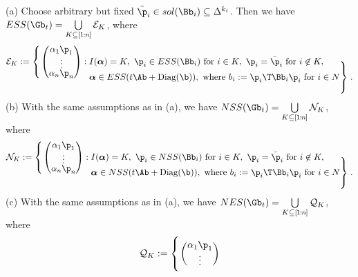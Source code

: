 \documentclass[moor]{informs3}              %
\def\Biggg#1{{\hbox{$\left#1\vbox to 20pt{}\right.$}}}
\def\Bigggl{\mathopen\Biggg}
\def\Bigggr{\mathclose\Biggg}
\def\irg#1#2{{ \in\! [{#1}\! : \! {#2}]}}
\def\rg#1#2{{ [\kern-.5pt{#1}\kern-.5pt : \kern-.5pt {#2}\kern-.5pt]}}
\def\coma#1{{#1}}
\begin{document}
\begin{thm}\label{bloa}
(a) Choose arbitrary but fixed $\bar\p_i\in {sol}(\Bb_i) \subseteq \Delta^{k_i}$.
Then we have $ESS(\Gb_t)=\bigcup\limits_{K\subseteq {\rg 1n}}\mathcal{E}_K$, where
\begin{equation}\begin{aligned}\label{ek}
\renewcommand*{\arraystretch}{.5}
\mathcal{E}_K:=\Bigggl\{\begin{pmatrix}
\alpha_1\p_1 \\
\vdots \\
\alpha_n\p_n
\end{pmatrix}:{} &{} I(\bm{\alpha})=K,\ \p_i\in ESS(\Bb_i)\textup{ for }i\in K,\ \p_i=\bar\p_i\textup{ for }i\not\in K,\\[-.8cm]
&\bm{\alpha}\in ESS(t\Ab+\textup{Diag}(\b)),\textup{ where }\coma{b_i:=\p_i\T\Bb_i\p_i\textup{ for }i\in N}
\Bigggr\}\, .
\end{aligned}\end{equation}
(b) With the same assumptions as in (a), we have $NSS(\Gb_t) = \bigcup\limits_{K\subseteq {\rg 1n}}\mathcal{N}_K$, where
\begin{equation}\begin{aligned}\label{nk}
\renewcommand*{\arraystretch}{.5}
\mathcal{N}_K:=\Bigggl\{\begin{pmatrix}
\alpha_1\p_1 \\
\vdots \\
\alpha_n\p_n
\end{pmatrix}:{} &{} I(\bm{\alpha})=K,\ \p_i\in NSS(\Bb_i)\textup{ for }i\in K,\ \p_i=\bar\p_i\textup{ for }i\not\in K,\\[-.8cm]
&\bm{\alpha}\in NSS(t\Ab+\textup{Diag}(\b)),\textup{ where }\coma{b_i:=\p_i\T\Bb_i\p_i\textup{ for }i\in N}
\Bigggr\}\, .
\end{aligned}\end{equation}
(c) With the same assumptions as in (a), we have $NES(\Gb_t) = \bigcup\limits_{K\subseteq {\rg 1n}}\mathcal{Q }_K$, where
\begin{equation}\begin{aligned}    %
\renewcommand*{\arraystretch}{.5}
\mathcal{Q}_K:=\Bigggl\{\begin{pmatrix}
\alpha_1\p_1 \\
\vdots \\

\end{pmatrix}
\end{aligned}
\end{equation}
\end{thm}
\end{document}
